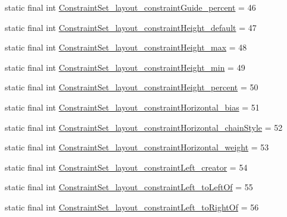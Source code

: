 \begin{DoxyCompactItemize}
\item 
static final int \mbox{\hyperlink{classandroid_1_1support_1_1constraint_1_1_r_1_1styleable_abadac67bcbd0c4b7ba1925aa772977db}{Constraint\+Set\+\_\+layout\+\_\+constraint\+Guide\+\_\+percent}} = 46
\item 
static final int \mbox{\hyperlink{classandroid_1_1support_1_1constraint_1_1_r_1_1styleable_a3224fe6e88d5fdc425f9f3008268d016}{Constraint\+Set\+\_\+layout\+\_\+constraint\+Height\+\_\+default}} = 47
\item 
static final int \mbox{\hyperlink{classandroid_1_1support_1_1constraint_1_1_r_1_1styleable_a38fb033c1f63e5e4e17ee0113f01277e}{Constraint\+Set\+\_\+layout\+\_\+constraint\+Height\+\_\+max}} = 48
\item 
static final int \mbox{\hyperlink{classandroid_1_1support_1_1constraint_1_1_r_1_1styleable_a3fceaf339114082d7362d00848ceb7ad}{Constraint\+Set\+\_\+layout\+\_\+constraint\+Height\+\_\+min}} = 49
\item 
static final int \mbox{\hyperlink{classandroid_1_1support_1_1constraint_1_1_r_1_1styleable_a3d44a12d7a4c7012c7bd1be384f42c06}{Constraint\+Set\+\_\+layout\+\_\+constraint\+Height\+\_\+percent}} = 50
\item 
static final int \mbox{\hyperlink{classandroid_1_1support_1_1constraint_1_1_r_1_1styleable_afd3f3354948096e74d195df32f2e4896}{Constraint\+Set\+\_\+layout\+\_\+constraint\+Horizontal\+\_\+bias}} = 51
\item 
static final int \mbox{\hyperlink{classandroid_1_1support_1_1constraint_1_1_r_1_1styleable_a9274c3ecb89e7a1b8bc720f54212d55d}{Constraint\+Set\+\_\+layout\+\_\+constraint\+Horizontal\+\_\+chain\+Style}} = 52
\item 
static final int \mbox{\hyperlink{classandroid_1_1support_1_1constraint_1_1_r_1_1styleable_a135ac36b131269c98840692ba3df28d4}{Constraint\+Set\+\_\+layout\+\_\+constraint\+Horizontal\+\_\+weight}} = 53
\item 
static final int \mbox{\hyperlink{classandroid_1_1support_1_1constraint_1_1_r_1_1styleable_a13510fe7761fdde6bed80a5b53095aef}{Constraint\+Set\+\_\+layout\+\_\+constraint\+Left\+\_\+creator}} = 54
\item 
static final int \mbox{\hyperlink{classandroid_1_1support_1_1constraint_1_1_r_1_1styleable_a545d043e03f2c4fbd82a9e3380469b3e}{Constraint\+Set\+\_\+layout\+\_\+constraint\+Left\+\_\+to\+Left\+Of}} = 55
\item 
static final int \mbox{\hyperlink{classandroid_1_1support_1_1constraint_1_1_r_1_1styleable_ad05b597ce292a9bb3022395966116eb8}{Constraint\+Set\+\_\+layout\+\_\+constraint\+Left\+\_\+to\+Right\+Of}} = 56

\end{DoxyCompactItemize}
